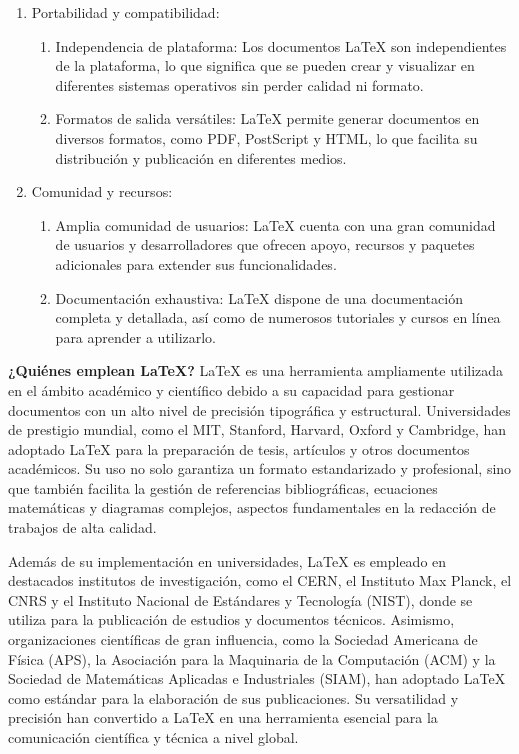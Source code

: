 \documentclass[12pt,twocolumn]{article}
\begin{document}
\begin{enumerate}
\begin{enumerate}
    \end{enumerate}
	\item Portabilidad y compatibilidad:
	\begin{enumerate}
        \item Independencia de plataforma: Los documentos LaTeX son independientes de la plataforma, lo que significa que se pueden crear y visualizar en diferentes sistemas operativos sin perder calidad ni formato.
        \item Formatos de salida versátiles: LaTeX permite generar documentos en diversos formatos, como PDF, PostScript y HTML, lo que facilita su distribución y publicación en diferentes medios.   
    \end{enumerate}
    \item Comunidad y recursos:
    \begin{enumerate}
        \item Amplia comunidad de usuarios: LaTeX cuenta con una gran comunidad de usuarios y desarrolladores que ofrecen apoyo, recursos y paquetes adicionales para extender sus funcionalidades.
        \item Documentación exhaustiva: LaTeX dispone de una documentación completa y detallada, así como de numerosos tutoriales y cursos en línea para aprender a utilizarlo.  
    \end{enumerate}
\end{enumerate} 
 
{\raggedleft \textbf{¿Quiénes emplean LaTeX?}}
LaTeX es una herramienta ampliamente utilizada en el ámbito académico y científico debido a su capacidad para gestionar documentos con un alto nivel de precisión tipográfica y estructural. 
Universidades de prestigio mundial, como el MIT, Stanford, Harvard, Oxford y Cambridge, han adoptado LaTeX para la preparación de tesis, artículos y otros documentos académicos. 
Su uso no solo garantiza un formato estandarizado y profesional, sino que también facilita la gestión de referencias bibliográficas, ecuaciones matemáticas y diagramas complejos, aspectos fundamentales en la redacción de trabajos de alta calidad.

Además de su implementación en universidades, LaTeX es empleado en destacados institutos de investigación, como el CERN, el Instituto Max Planck, el CNRS y el Instituto Nacional de Estándares y Tecnología (NIST), donde se utiliza para la publicación de estudios y documentos técnicos. 
Asimismo, organizaciones científicas de gran influencia, como la Sociedad Americana de Física (APS), la Asociación para la Maquinaria de la Computación (ACM) y la Sociedad de Matemáticas Aplicadas e Industriales (SIAM), han adoptado LaTeX como estándar para la elaboración de sus publicaciones. 
Su versatilidad y precisión han convertido a LaTeX en una herramienta esencial para la comunicación científica y técnica a nivel global.
\end{document}
